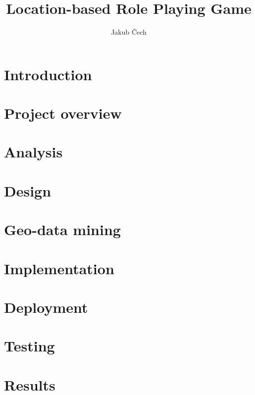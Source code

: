 \documentclass[thesis=B,english]{FITthesis}[2012/10/20]
\title{Location-based Role Playing Game}
\author{Jakub Čech} %
\begin{document}
	
	\chapter{Introduction}
	
	
	
	\chapter{Project overview}
	
	
	\chapter{Analysis}
	
	
	\chapter{Design}
	
	
	\chapter{Geo-data mining}
	
	
	\chapter{Implementation}
	
	
	\chapter{Deployment}
	
	
	\chapter{Testing}
	
	
	
	\chapter{Results}
	
	
	\printbibliography
\end{document}
